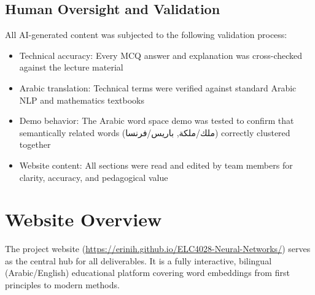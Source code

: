 \subsection{Human Oversight and Validation}
All AI-generated content was subjected to the following validation process:
\begin{itemize}
    \item Technical accuracy: Every MCQ answer and explanation was cross-checked against the lecture material
    \item Arabic translation: Technical terms were verified against standard Arabic NLP and mathematics textbooks
    \item Demo behavior: The Arabic word space demo was tested to confirm that semantically related words (\textarabic{ملك/ملكة}, \textarabic{باريس/فرنسا}) correctly clustered together
    \item Website content: All sections were read and edited by team members for clarity, accuracy, and pedagogical value
\end{itemize}

\section{Website Overview}

The project website (\url{https://erinih.github.io/ELC4028-Neural-Networks/}) serves as the central hub for all deliverables. It is a fully interactive, bilingual (Arabic/English) educational platform covering word embeddings from first principles to modern methods.

